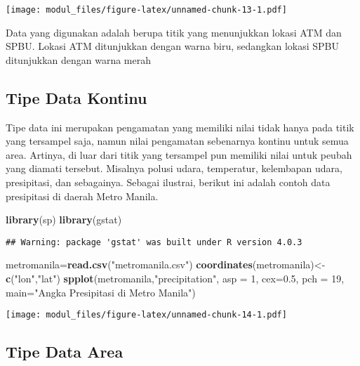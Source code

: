 \documentclass[
]{book}
\newenvironment{Shaded}{\begin{snugshade}}{\end{snugshade}}
\newcommand{\DataTypeTok}[1]{\textcolor[rgb]{0.13,0.29,0.53}{#1}}
\newcommand{\DecValTok}[1]{\textcolor[rgb]{0.00,0.00,0.81}{#1}}
\newcommand{\FloatTok}[1]{\textcolor[rgb]{0.00,0.00,0.81}{#1}}
\newcommand{\KeywordTok}[1]{\textcolor[rgb]{0.13,0.29,0.53}{\textbf{#1}}}
\newcommand{\NormalTok}[1]{#1}
\newcommand{\StringTok}[1]{\textcolor[rgb]{0.31,0.60,0.02}{#1}}
\begin{document}
\texttt{[image: modul\_files/figure-latex/unnamed-chunk-13-1.pdf]}

Data yang digunakan adalah berupa titik yang menunjukkan lokasi ATM dan SPBU. Lokasi ATM ditunjukkan dengan warna biru, sedangkan lokasi SPBU ditunjukkan dengan warna merah

\hypertarget{tipe-data-kontinu}{%
\subsection{Tipe Data Kontinu}\label{tipe-data-kontinu}}

Tipe data ini merupakan pengamatan yang memiliki nilai tidak hanya pada titik yang tersampel saja, namun nilai pengamatan sebenarnya kontinu untuk semua area. Artinya, di luar dari titik yang tersampel pun memiliki nilai untuk peubah yang diamati tersebut. Misalnya polusi udara, temperatur, kelembapan udara, presipitasi, dan sebagainya. Sebagai ilustrai, berikut ini adalah contoh data presipitasi di daerah Metro Manila.

\begin{Shaded}
\begin{Highlighting}[]
\KeywordTok{library}\NormalTok{(sp)}
\KeywordTok{library}\NormalTok{(gstat)}
\end{Highlighting}
\end{Shaded}

\begin{verbatim}
## Warning: package 'gstat' was built under R version 4.0.3
\end{verbatim}

\begin{Shaded}
\begin{Highlighting}[]
\NormalTok{metromanila=}\KeywordTok{read.csv}\NormalTok{(}\StringTok{"metromanila.csv"}\NormalTok{)}
\KeywordTok{coordinates}\NormalTok{(metromanila)\textless{}{-}}\KeywordTok{c}\NormalTok{(}\StringTok{"lon"}\NormalTok{,}\StringTok{"lat"}\NormalTok{)}
\KeywordTok{spplot}\NormalTok{(metromanila,}\StringTok{"precipitation"}\NormalTok{, }\DataTypeTok{asp =} \DecValTok{1}\NormalTok{,}
       \DataTypeTok{cex=}\FloatTok{0.5}\NormalTok{, }\DataTypeTok{pch =} \DecValTok{19}\NormalTok{, }\DataTypeTok{main=}\StringTok{"Angka Presipitasi di Metro Manila"}\NormalTok{)}
\end{Highlighting}
\end{Shaded}

\texttt{[image: modul\_files/figure-latex/unnamed-chunk-14-1.pdf]}

\hypertarget{tipe-data-area}{%
\subsection{Tipe Data Area}\label{tipe-data-area}}
\end{document}
